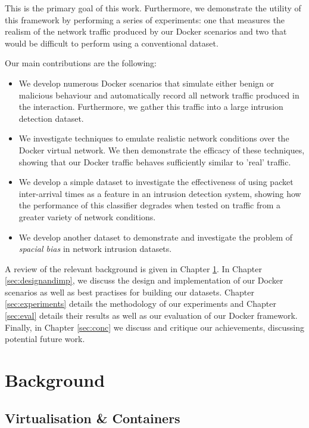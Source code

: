 \documentclass[msc,deptreport, cs]{infthesis} %
\begin{document}
This is the primary goal of this work. Furthermore, we demonstrate the utility of this framework by performing a series of experiments: one that measures the realism of the network traffic produced by our Docker scenarios and two that would be difficult to perform using a conventional dataset.

Our main contributions are the following:

\begin{itemize}
\item We develop numerous Docker scenarios that simulate either benign or malicious behaviour and automatically record all network traffic produced in the interaction. Furthermore, we gather this traffic into a large intrusion detection dataset.

\item We investigate techniques to emulate realistic network conditions over the Docker virtual network. We then demonstrate the efficacy of these techniques, showing that our Docker traffic behaves sufficiently similar to 'real' traffic.

\item We develop a simple dataset to investigate the effectiveness of using packet inter-arrival times as a feature in an intrusion detection system, showing how the performance of this classifier degrades when tested on traffic from a greater variety of network conditions.

\item We develop another dataset to demonstrate and investigate the problem of \textit{spacial bias} in network intrusion datasets.

\end{itemize}


A review of the relevant background is given in Chapter \ref{background}. In Chapter \ref{sec:designandimp}, we discuss the design and implementation of our Docker scenarios as well as best practises for building our datasets. Chapter \ref{sec:experiments} details the methodology of our experiments and Chapter \ref{sec:eval} details their results as well as our evaluation of our Docker framework. Finally, in Chapter \ref{sec:conc} we discuss and critique our achievements, discussing potential future work.

\chapter{Background}
\label{background}
\section{Virtualisation \& Containers}
\end{document}
